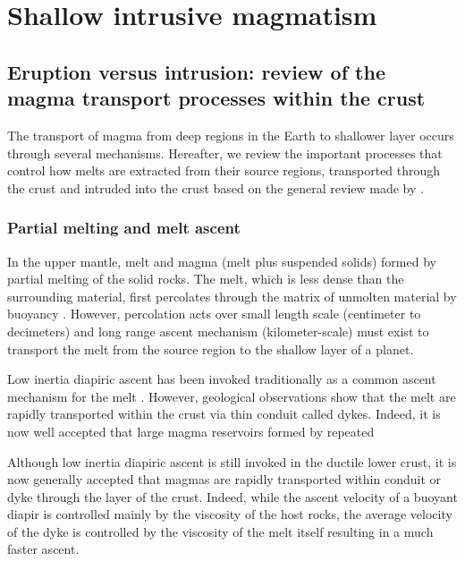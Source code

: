 \chapter{Shallow intrusive magmatism} 
\label{chap1} 
\minitoc
 
\section{Eruption  versus intrusion:  review  of  the magma  transport
  processes within the crust}
\label{sec:magma-transp-with}

The transport  of magma from  deep regions  in the Earth  to shallower
layer  occurs through  several mechanisms.   Hereafter, we  review the
important processes  that control how  melts are extracted  from their
source regions,  transported through the  crust and intruded  into the
crust based on the general review made by \citep{Petford:2000cc}.

\subsection{Partial melting and melt ascent}

In  the upper  mantle, melt  and  magma (melt  plus suspended  solids)
formed by partial melting of the  solid rocks. The melt, which is less
dense  than the  surrounding  material, first  percolates through  the
matrix       of       unmolten        material       by       buoyancy
\citep{McKenzy:1984bo,McKenzie:1985jq}. However, percolation acts over
small length  scale (centimeter to  decimeters) and long  range ascent
mechanism (kilometer-scale) must exist to  transport the melt from the
source region to the shallow layer of a planet.


Low inertia diapiric ascent has been invoked traditionally as a common
ascent   mechanism  for   the  melt   \citep{Miller:1999km}.  However,
geological  observations show  that the  melt are  rapidly transported
within the  crust via thin  conduit called  dykes.  Indeed, it  is now
well  accepted   that  large  magma  reservoirs   formed  by  repeated


Although low inertia diapiric ascent is still invoked  in the ductile
lower  crust, it  is now  generally accepted  that magmas  are rapidly
transported within  conduit or  dyke through the  layer of  the crust.
Indeed, while  the ascent velocity  of a buoyant diapir  is controlled
mainly by the viscosity of the host rocks, the average velocity of the
dyke is controlled by the viscosity  of the melt itself resulting in a
much faster ascent.



